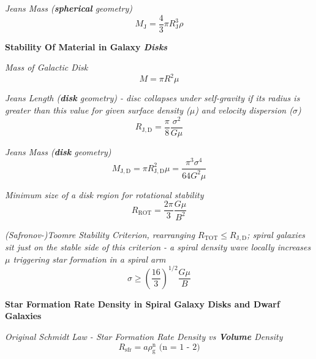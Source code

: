 \documentclass{spy}
\begin{document}
\textit{Jeans Mass (\textbf{spherical} geometry)}
\begin{equation}
M_\mathrm{J} = \frac{4}{3} \pi R^3_\mathrm{J} \rho
\end{equation}


\textbf {Stability Of Material in Galaxy \textit{Disks}}

\textit {Mass of Galactic Disk}
\begin{equation}
M = \pi R^2 \mu 
\end{equation}
\begin{center}
\end{center}

\textit {Jeans Length (\textbf{disk} geometry) - disc collapses under self-gravity if its radius is greater than this value for given surface density (\(\mu\)) and velocity dispersion (\(\sigma\)) }
\begin{equation}
R_\mathrm{J, D} = \frac {\pi}{8} \frac {\sigma^2}{G \mu}
\end{equation}

\textit {Jeans Mass (\textbf{disk} geometry)}
\begin{equation}
M_\mathrm{J, D} = \pi R^2_\mathrm{J,D} \mu = \frac{\pi^3 \sigma^4}{64 G^2 \mu}
\end{equation}

\textit {Minimum size of a disk region for rotational stability}
\begin{equation}
R_\mathrm{ROT} = \frac {2\pi}{3} \frac {G \mu}{B^2}
\end{equation}
\begin{center}
\end{center}

\textit {(Safronov-)Toomre Stability Criterion, rearranging \(R_\mathrm{TOT} \leq R_\mathrm{J, D}\); spiral galaxies sit just on the stable side of this criterion - a spiral density wave locally increases \(\mu\) triggering star formation in a spiral arm}
\begin{equation}
\sigma \geq \left( \frac {16}{3} \right) ^{1/2} \frac {G \mu}{B}
\end{equation}

\textbf {Star Formation Rate Density in Spiral Galaxy Disks and Dwarf Galaxies}

\textit {Original Schmidt Law - Star Formation Rate Density vs \textbf{Volume} Density}
\begin{equation}
R_\mathrm{sfr} = a \rho^\mathrm{n}_\mathrm{g} \text{ (n = 1 - 2)}
\end{equation}
\end{document}
